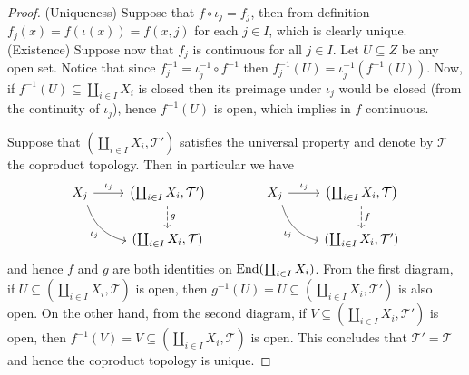\begin{proof}
  (Uniqueness) Suppose that \(f \circ \iota_j = f_j\), then from definition
  \(f_j(x) = f(\iota(x)) = f(x, j)\) for each \(j \in I\), which is clearly
  unique.
  (Existence) Suppose now that \(f_j\) is continuous for all \(j \in I\). Let
  \(U \subseteq Z\) be any open set. Notice that since \(f_j^{-1} = \iota_j^{-1}
  \circ f^{-1}\) then \(f_j^{-1}(U) = \iota_j^{-1}(f^{-1}(U))\). Now, if
  \(f^{-1}(U) \subseteq \coprod_{i \in I} X_i\) is closed then its preimage
  under \(\iota_j\) would be closed (from the continuity of \(\iota_j\)), hence
  \(f^{-1}(U)\) is open, which implies in \(f\) continuous.

  Suppose that \((\coprod_{i \in I} X_i, \mathcal T')\) satisfies the universal
  property and denote by \(\mathcal T\) the coproduct topology. Then in
  particular we have
  \[
    \begin{tikzcd}
      X_j \ar[r, "\iota_j"] \ar[rd, bend right, swap, "\iota_j"]
        &\left( \coprod_{i \in I} X_i, \mathcal T' \right)
        \ar[d, dashed, "g"] \\
        &(\coprod_{i \in I} X_i, \mathcal T)
    \end{tikzcd}
    \qquad \qquad
    \begin{tikzcd}
      X_j \ar[r, "\iota_j"] \ar[rd, bend right, swap, "\iota_j"]
        &\left( \coprod_{i \in I} X_i, \mathcal T \right)
        \ar[d, dashed, "f"] \\
        &(\coprod_{i \in I} X_i, \mathcal T')
    \end{tikzcd}
  \]
  and hence \(f\) and \(g\) are both identities on \(\operatorname{End}(\coprod_{i \in I}
  X_i)\). From the first diagram, if \(U \subseteq (\coprod_{i \in I} X_i,
  \mathcal T)\) is open, then \(g^{-1}(U) = U \subseteq (\coprod_{i \in I} X_i,
  \mathcal T')\) is also open. On the other hand, from the second diagram, if
  \(V \subseteq (\coprod_{i \in I} X_i, \mathcal T')\) is open, then \(f^{-1}(V)
  = V \subseteq (\coprod_{i \in I} X_i, \mathcal T)\) is open. This concludes
  that \(\mathcal T' = \mathcal T\) and hence the coproduct topology is unique.
\end{proof}

